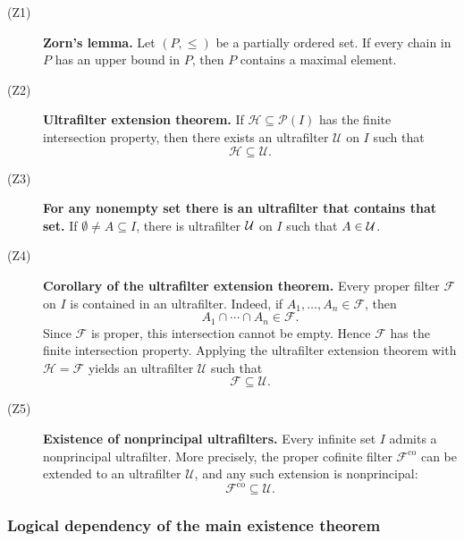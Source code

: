{\begin{description}
    \item[\textnormal{(Z1)}] \textbf{Zorn's lemma.}
    Let \((P,\leq)\) be a partially ordered set. If every chain in \(P\)
    has an upper bound in \(P\), then \(P\) contains a maximal element.

    \item[\textnormal{(Z2)}] \textbf{Ultrafilter extension theorem.}
    If \(\mathcal{H}\subseteq\mathcal{P}(I)\) has the finite intersection
    property, then there exists an ultrafilter \(\mathcal{U}\) on \(I\)
    such that
    \[
    \mathcal{H}\subseteq\mathcal{U}.
    \]

    \item[\textnormal{(Z3)}] \textbf{For any nonempty set there is an ultrafilter that contains that set.}
    If $\emptyset \neq A \subseteq I$, there is ultrafilter $\mathcal{U}$ on $I$ such that $A \in \mathcal{U}$.

    \item[\textnormal{(Z4)}]
\textbf{Corollary of the ultrafilter extension theorem.}
Every proper filter \(\mathcal{F}\) on \(I\) is contained in an ultrafilter.
Indeed, if \(A_1,\ldots,A_n\in\mathcal{F}\), then
\[
A_1\cap\cdots\cap A_n\in\mathcal{F}.
\]
Since \(\mathcal{F}\) is proper, this intersection cannot be empty. Hence
\(\mathcal{F}\) has the finite intersection property. Applying the
ultrafilter extension theorem with \(\mathcal{H}=\mathcal{F}\) yields an
ultrafilter \(\mathcal{U}\) such that
\[
\mathcal{F}\subseteq\mathcal{U}.
\]


    \item[\textnormal{(Z5)}] \textbf{Existence of nonprincipal ultrafilters.}
    Every infinite set \(I\) admits a nonprincipal ultrafilter. More
    precisely, the proper cofinite filter \(\mathcal{F}^{\mathrm{co}}\) can
    be extended to an ultrafilter \(\mathcal{U}\), and any such extension
    is nonprincipal:
    \[
    \mathcal{F}^{\mathrm{co}}
    \subseteq
    \mathcal{U}.
    \]
\end{description}

\subsubsection*{Logical dependency of the main existence theorem}

}
